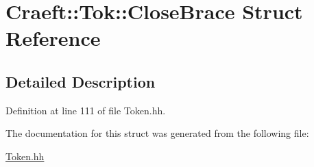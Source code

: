 \hypertarget{struct_craeft_1_1_tok_1_1_close_brace}{}\section{Craeft\+:\+:Tok\+:\+:Close\+Brace Struct Reference}
\label{struct_craeft_1_1_tok_1_1_close_brace}


\subsection{Detailed Description}


Definition at line 111 of file Token.\+hh.



The documentation for this struct was generated from the following file\+:\begin{DoxyCompactItemize}
\item 
\hyperlink{_token_8hh}{Token.\+hh}\end{DoxyCompactItemize}
